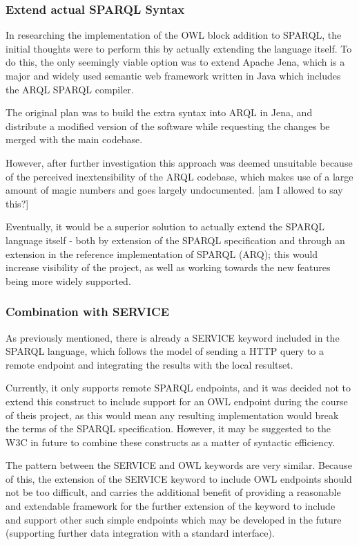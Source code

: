 \documentclass{article}
\begin{document}
\subsubsection{Extend actual SPARQL Syntax}

In researching the implementation of the OWL block addition to SPARQL, the
initial thoughts were to perform this by actually extending the language itself.
To do this, the only seemingly viable option was to extend Apache Jena, which is
a major and widely used semantic web framework written in Java which includes the 
ARQL SPARQL compiler. 

The original plan was to build the extra syntax into ARQL in Jena, and
distribute a modified version of the software while requesting the changes be
merged with the main codebase.

However, after further investigation this approach was deemed unsuitable because
of the perceived inextensibility of the ARQL codebase, which makes use of a
large amount of magic numbers and goes largely undocumented. [am I allowed to
say this?]

Eventually, it would be a superior solution to actually extend the SPARQL
language itself - both by extension of the SPARQL
specification and through an extension in the reference implementation of SPARQL
(ARQ); this would increase visibility of the
project, as well as working towards the new features being more widely
supported.

\subsubsection{Combination with SERVICE}

As previously mentioned, there is already a SERVICE keyword included in the
SPARQL language, which follows the model of sending a HTTP query to a remote
endpoint and integrating the results with the local resultset. 

Currently, it only supports remote SPARQL endpoints, and it was decided not to 
extend this construct to include support for an OWL endpoint during the course
of theis project, as this would mean any resulting implementation would break 
the terms of the SPARQL specification. However, it may be suggested to the W3C 
in future to combine these constructs as a matter of syntactic efficiency. 

The pattern between the SERVICE and OWL keywords are very
similar. Because of this, the extension of the SERVICE keyword to include OWL
endpoints should not be too difficult, and carries the additional benefit of
providing a reasonable and extendable framework for the further extension of the
keyword to include and support other such simple endpoints which may be
developed in the future (supporting further data integration with a standard
interface).
\end{document}
